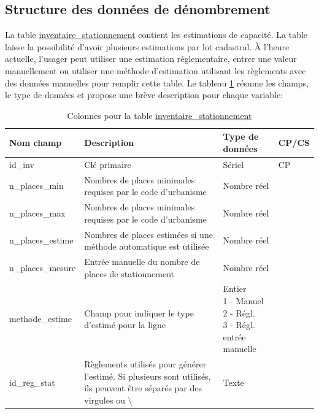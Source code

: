     \subsection{Structure des données de dénombrement}\label{ssec:survol-table-inventaire}
            La table \underline{inventaire\_stationnement} contient les estimations de capacité. La table laisse la possibilité d'avoir plusieurs estimations par lot cadastral. À l'heure actuelle, l'usager peut utiliser une estimation réglementaire, entrer une valeur manuellement ou utiliser une méthode d'estimation utilisant les règlements avec des données manuelles pour remplir cette table. Le tableau \ref{tab:definition_table_inventaire} résume les champs, le type de données et propose une brève description pour chaque variable:
            \begin{table}[h]
                \caption{Colonnes pour la table \underline{inventaire\_stationnement}}
                \label{tab:definition_table_inventaire}
                \centering
                \begin{tabular}{m{}|m{}m{}m{}}
                    \hline
                    Nom champ & Description & Type de données & CP/CS  \\
                    \hline
                    id\_inv & Clé primaire  & Sériel & CP \\ 

                    n\_places\_min & 
                    Nombres de places minimales requises par le code d'urbanisme & 
                    Nombre réel &
                    \\ 

                    n\_places\_max & 
                    Nombres de places minimales requises par le code d'urbanisme & 
                    Nombre réel & 
                    \\ 

                    n\_places\_estime & 
                    Nombres de places estimées si une méthode automatique est utilisée & 
                    Nombre réel &
                    \\ 

                    n\_places\_mesure & 
                    Entrée manuelle du nombre de places de stationnement & 
                    Nombre réel &
                    \\

                    methode\_estime & 
                    Champ pour indiquer le type d'estimé pour la ligne & 
                    \makecell[l]{Entier\\
                    1 - Manuel\\
                    2 - Régl.\\
                    3 - Régl. entrée manuelle}  & \\ 
                    id\_reg\_stat & 
                    Règlements utilisés pour générer l'estimé. Si plusieurs sont utilisés, ils peuvent être séparés par des virgules ou \textbackslash & 
                    Texte & 
                    \\ 


\end{tabular}
\end{table}
